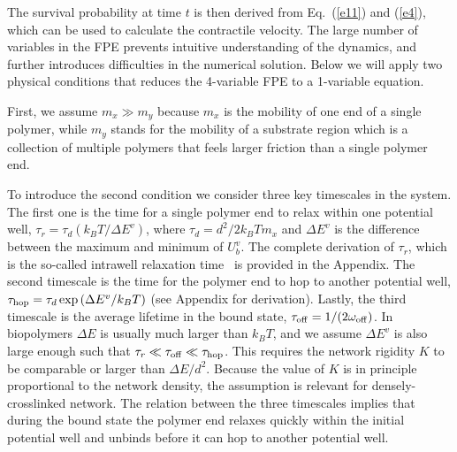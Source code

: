 \documentclass[twocolumn,prl,english]{revtex4-1}
\begin{document}
The survival probability at time $t$  is then derived from Eq.~(\ref{e11}) and (\ref{e4}), which can  be used to calculate the contractile velocity. The large number of variables in the FPE prevents intuitive understanding of the dynamics, and further introduces difficulties in the numerical solution. Below we will apply two physical conditions that reduces the 4-variable FPE  to a 1-variable equation. 

First, we assume $m_x \gg m_y$ because $m_x$ is the mobility of one end of a single polymer, while $m_y$ stands for the mobility of a substrate region which is a collection of multiple polymers that feels larger friction than a single polymer end. 

To introduce the second condition we consider three key timescales in the system. The first one is the time for a single polymer end to relax within one potential well, $\tau_{r} = \tau_d\left({k_B T}/{\Delta E^v}\right)$, where $\tau_d = { d^2}/{2k_B Tm_x}$ and $\Delta E^v$ is the difference between the maximum and minimum of $U_b^v$. The complete derivation of $\tau_r$, which is the so-called intrawell relaxation time~\cite{Derenyi1999} is provided in the Appendix. The second timescale is the time for the polymer end to hop to another potential well, $\tau_{\rm hop} =  \tau_d \exp\left({\Delta E^v}/{k_B T}\right)$ (see Appendix for derivation). Lastly, the third timescale is the average lifetime in the bound state, $\tau_{\rm off} = 1/(2\omega_{\rm off})$. In biopolymers $\Delta E$ is usually much larger than $k_B T$, and we assume $\Delta E^v$ is also large enough such that $\tau_r \ll \tau_{\rm off} \ll \tau_{\rm hop}$. This requires the network rigidity $K$ to be comparable or larger than $\Delta E/d^2$. Because the value of $K$ is in principle proportional to the network density, the assumption is relevant for densely-crosslinked network. The relation between the three timescales implies that during the bound state the polymer end relaxes quickly within the initial potential well and unbinds before it can hop to another potential well. 
\end{document}
